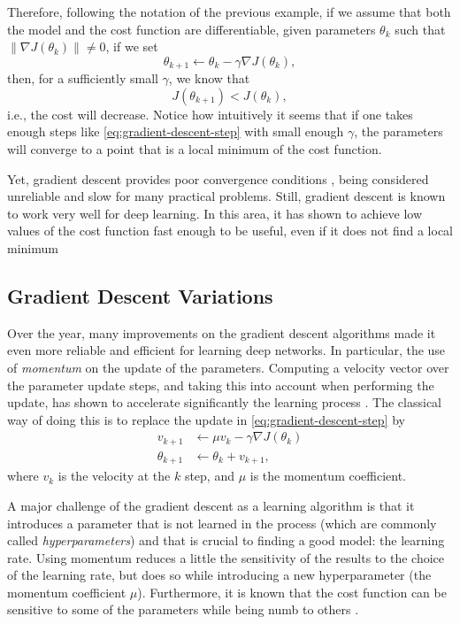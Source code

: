 Therefore, following the notation of the previous example, if we assume that both the model and the cost function are differentiable, given parameters $\theta_k$ such that $\| \nabla J(\theta_k) \| \neq 0$, if we set
\begin{equation}\label{eq:gradient-descent-step}
\theta_{k+1} \gets \theta_k - \gamma \nabla J(\theta_k) 
,\end{equation}
then, for a sufficiently small $\gamma$, we know that \[
J\left( \theta_{k+1} \right) < J\left( \theta_k \right) 
,\] i.e., the cost will decrease.
Notice how intuitively it seems that if one takes enough steps like \eqref{eq:gradient-descent-step} with small enough $\gamma$, the parameters will converge to a point that is a local minimum of the cost function.


Yet, gradient descent provides poor convergence conditions \cite{wolfe_convergence_1969}, being considered unreliable and slow for many practical problems.
Still, gradient descent is known to work very well for deep learning.
In this area, it has shown to achieve low values of the cost function fast enough to be useful, even if it does not find a local minimum \cite{goodfellow_deep_2016}

\subsection{Gradient Descent Variations}

Over the year, many improvements on the gradient descent algorithms made it even more reliable and efficient for learning deep networks.
In particular, the use of \textit{momentum} on the update of the parameters.
Computing a velocity vector over the parameter update steps, and taking this into account when performing the update, has shown to accelerate significantly the learning process \cite{sutskever_importance_2013}.
The classical way of doing this is to replace the update in \eqref{eq:gradient-descent-step} by
\begin{align*}
    v_{k+1} &\gets \mu v_k - \gamma \nabla J(\theta_k) \\
    \theta_{k+1} &\gets \theta_k + v_{k+1}
,\end{align*}
where $v_k$ is the velocity at the $k$ step, and $\mu$ is the momentum coefficient.

A major challenge of the gradient descent as a learning algorithm is that it introduces a parameter that is not learned in the process (which are commonly called \emph{hyperparameters}) and that is crucial to finding a good model: the learning rate.
Using momentum reduces a little the sensitivity of the results to the choice of the learning rate, but does so while introducing a new hyperparameter (the momentum coefficient $\mu$).
Furthermore, it is known that the cost function can be sensitive to some of the parameters while being numb to others \cite{goodfellow_deep_2016}.

